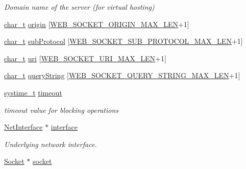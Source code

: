 \begin{DoxyCompactItemize}
\begin{DoxyCompactList}\small\item\em Domain name of the server (for virtual hosting) \end{DoxyCompactList}\item 
\hyperlink{compiler__port_8h_a40bb5262bf908c328fbcfbe5d29d0201}{char\+\_\+t} \hyperlink{struct__WebSocket_abaa9ad9f96c6d5727c3c38608d549fce}{origin} \mbox{[}\hyperlink{web__socket_8h_a5c93d131ef16f066ea2c64453dcc52aa}{W\+E\+B\+\_\+\+S\+O\+C\+K\+E\+T\+\_\+\+O\+R\+I\+G\+I\+N\+\_\+\+M\+A\+X\+\_\+\+L\+EN}+1\mbox{]}
\item 
\hyperlink{compiler__port_8h_a40bb5262bf908c328fbcfbe5d29d0201}{char\+\_\+t} \hyperlink{struct__WebSocket_a6342b26e8c294f6b28252eb5510f8b4a}{sub\+Protocol} \mbox{[}\hyperlink{web__socket_8h_a5a98133b0c199ecd9542c4c6d9388550}{W\+E\+B\+\_\+\+S\+O\+C\+K\+E\+T\+\_\+\+S\+U\+B\+\_\+\+P\+R\+O\+T\+O\+C\+O\+L\+\_\+\+M\+A\+X\+\_\+\+L\+EN}+1\mbox{]}
\item 
\hyperlink{compiler__port_8h_a40bb5262bf908c328fbcfbe5d29d0201}{char\+\_\+t} \hyperlink{struct__WebSocket_aaebc5d67a16da72ef1aa214bbf512918}{uri} \mbox{[}\hyperlink{web__socket_8h_ace530d4ae5bedbea825d9ac103cf2741}{W\+E\+B\+\_\+\+S\+O\+C\+K\+E\+T\+\_\+\+U\+R\+I\+\_\+\+M\+A\+X\+\_\+\+L\+EN}+1\mbox{]}
\item 
\hyperlink{compiler__port_8h_a40bb5262bf908c328fbcfbe5d29d0201}{char\+\_\+t} \hyperlink{struct__WebSocket_a8cc5673e4aec46c4798cc72116b49ac3}{query\+String} \mbox{[}\hyperlink{web__socket_8h_aa438876c03fc0dc137c3aaedc4a3071d}{W\+E\+B\+\_\+\+S\+O\+C\+K\+E\+T\+\_\+\+Q\+U\+E\+R\+Y\+\_\+\+S\+T\+R\+I\+N\+G\+\_\+\+M\+A\+X\+\_\+\+L\+EN}+1\mbox{]}
\item 
\hyperlink{compiler__port_8h_ae3e32a98d431a02106616da3071832dd}{systime\+\_\+t} \hyperlink{struct__WebSocket_a5d2b33265ae63f5457c339b4d4388169}{timeout}
\begin{DoxyCompactList}\small\item\em timeout value for blocking operations \end{DoxyCompactList}\item 
\hyperlink{net_8h_a2234db8911a1148c9159979d8f5e0d6b}{Net\+Interface} $\ast$ \hyperlink{struct__WebSocket_a476f25b02cd35cc337db0f56529caa8e}{interface}
\begin{DoxyCompactList}\small\item\em Underlying network interface. \end{DoxyCompactList}\item 
\hyperlink{socket_8h_aa85acfb0fa336ef495e6ba87fb88fc48}{Socket} $\ast$ \hyperlink{struct__WebSocket_a56127e9446d0372f444135b0fe6c50cc}{socket}

\end{DoxyCompactItemize}
